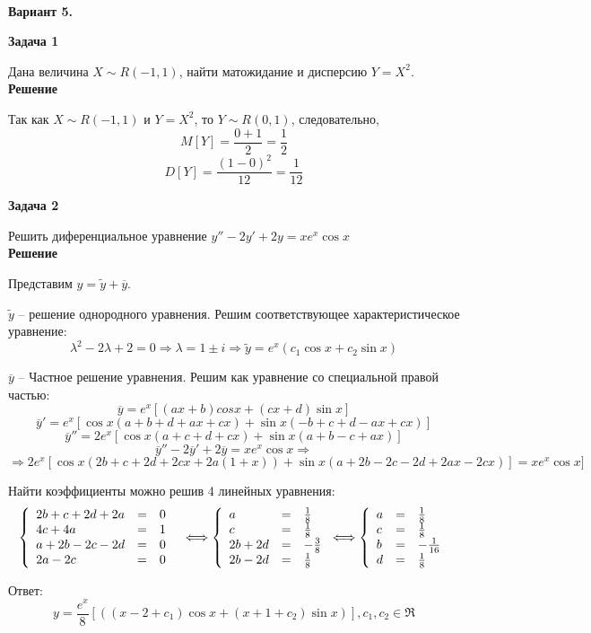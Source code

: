 \documentclass[12pt]{article}
\begin{document}
\begin{flushleft}
	\parindent=0.5cm
	\hangindent=-0.5cm 
\par{\ } \\
\textbf{Вариант 5.} 

\textbf{Задача 1}
\par{Дана величина $X \sim R(-1,1)$, найти матожидание и дисперсию $Y=X^2$.\\}
\textbf{Решение}
\par{Так как $X \sim R(-1,1)$ и $Y=X^2$, то $Y \sim R(0,1)$, следовательно, 
$$M[Y] = \frac{0+1}{2} = \frac{1}{2}$$
$$D[Y] = \frac{(1-0)^2}{12} = \frac{1}{12}$$
}

\textbf{Задача 2}
\par{Решить диференциальное уравнение $y''-2y'+2y=xe^{x}\cos{x}$} \\
\textbf{Решение}
\par{Представим $y = \tilde{y} + \overline{y}$.} \\
\par{$\tilde{y}$ -- решение однородного уравнения. Решим соответствующее характеристическое уравнение:}
$$ \lambda^2 - 2\lambda + 2 = 0 \Rightarrow \lambda = 1 \pm i \Rightarrow \tilde{y} = e^{x}(c_{1}\cos{x} + c_{2}\sin{x})$$
\par{$\overline{y}$ -- Частное решение уравнения. Решим как уравнение со специальной правой частью:}
$$\overline{y} = e^{x}[(ax+b)cos{x} + (cx+d)\sin{x}]$$
$$\overline{y}' = e^x [\cos{x}(a + b + d + a x + c x) + \sin{x}(-b + c + d - a x + c x)]$$
$$\overline{y}'' = 2 e^x [\cos{x}(a + c + d + c x) + \sin{x}(a + b - c + a x)]$$
$$\overline{y}'' - 2 \overline{y}' + 2\overline{y} = xe^{x}\cos{x} \Rightarrow$$
$$\Rightarrow 
2 e^x [\cos{x}(2 b + c + 2 d + 2 c x + 2 a (1 + x)) + \sin{x}(a + 2 b - 2 c - 2 d + 2 a x - 2 c x)] = xe^{x}\cos{x}]$$
\par{Найти коэффициенты можно решив 4 линейных уравнения:}\\
$$
\left\{
\begin{array}[c]{lcl} 
2b+c+2d+2a & = & 0 \\
4c + 4a & = & 1 \\ 
a+2b-2c-2d & = & 0 \\
2a-2c & = & 0 \ \  
\end{array}\right. \Longleftrightarrow
\left\{
\begin{array}[c]{lcl} 
a & = & \frac{1}{8} \\
c & = & \frac{1}{8} \\ 
2b+2d & = & -\frac{3}{8} \\
2b-2d & = & \frac{1}{8}   
\end{array}\right. \Longleftrightarrow
\left\{
\begin{array}[c]{lcl} 
a & = & \frac{1}{8} \\
c & = & \frac{1}{8} \\ 
b & = & -\frac{1}{16} \\
d & = & \frac{1}{8}  
\end{array}\right. 
$$
\par{Ответ:}
$$
y = \frac{e^{x}}{8}[((x-2+c_1)\cos{x} + (x+1+c_2)\sin{x})], c_1, c_2 \in \Re
$$



\end{flushleft}
\end{document}
